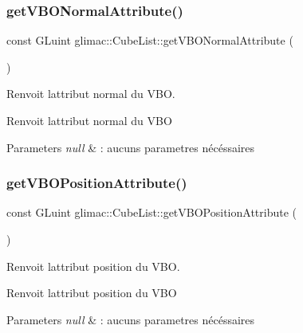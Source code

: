 \subsubsection{\texorpdfstring{get\+V\+B\+O\+Normal\+Attribute()}{getVBONormalAttribute()}}
{\footnotesize\ttfamily const G\+Luint glimac\+::\+Cube\+List\+::get\+V\+B\+O\+Normal\+Attribute (\begin{DoxyParamCaption}{ }\end{DoxyParamCaption})\hspace{0.3cm}{\ttfamily [inline]}}



Renvoit l\textquotesingle{}attribut normal du V\+BO. 

Renvoit l\textquotesingle{}attribut normal du V\+BO


\begin{DoxyParams}{Parameters}
{\em null} & \+: aucuns parametres nécéssaires \\
\hline
\end{DoxyParams}
\mbox{\label{classglimac_1_1CubeList_a849ccb890002bf4c1f0692741219e076}} 
\subsubsection{\texorpdfstring{get\+V\+B\+O\+Position\+Attribute()}{getVBOPositionAttribute()}}
{\footnotesize\ttfamily const G\+Luint glimac\+::\+Cube\+List\+::get\+V\+B\+O\+Position\+Attribute (\begin{DoxyParamCaption}{ }\end{DoxyParamCaption})\hspace{0.3cm}{\ttfamily [inline]}}



Renvoit l\textquotesingle{}attribut position du V\+BO. 

Renvoit l\textquotesingle{}attribut position du V\+BO


\begin{DoxyParams}{Parameters}
{\em null} & \+: aucuns parametres nécéssaires \\
\hline
\end{DoxyParams}
\mbox{\label{classglimac_1_1CubeList_aa1d8214db32aa1e60d77b18559f0a2eb}} 
